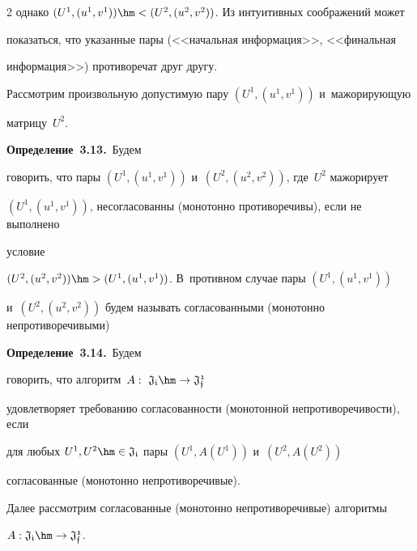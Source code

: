 \begin{multicols}{2}
однако $(U^1, (u^1,v^1)) \hm< (U^2, (u^2,v^2))$. Из интуитивных соображений может 


показаться,  что указанные пары (<<начальная информация>>, <<финальная 


информация>>) противоречат друг другу.





Рассмотрим произвольную допустимую пару $(U^1,(u^1,v^1))$ и~мажорирующую  


матрицу~$U^2$.





\smallskip





\noindent


\textbf{Определение~3.13.}\ Будем 


говорить, что пары $(U^1,(u^1,v^1))$ и~$(U^2,(u^2,v^2))$, где~$U^2$ мажорирует 


$(U^1,(u^1,v^1))$, несогласованны (монотонно противоречивы), если не выполнено 


условие


$(U^2,(u^2,v^2)) \hm> (U^1,(u^1,v^1))$. В~противном случае пары $(U^1,(u^1,v^1))$


и~$(U^2,(u^2,v^2))$ будем называть согласованными (монотонно непротиворечивыми)





\smallskip





\noindent


\textbf{Определение~3.14.}\ Будем 


говорить, что алгоритм~$A:~\mathfrak{J_i} \hm\rightarrow \mathfrak{J_f^1}$  


удовлетворяет требованию согласованности (монотонной непротиворечивости), если 


для любых $ U^1, U^2 \hm\in \mathfrak{J_i}$ пары $(U^1,A(U^1))$ и~$(U^2,A(U^2))$ 


согласованные (монотонно непротиворечивые).





\smallskip





Далее рассмотрим согласованные (монотонно непротиворечивые) алгоритмы 


$A:\mathfrak{J_i} \hm\rightarrow \mathfrak{J_f^1}$.






\end{multicols}
